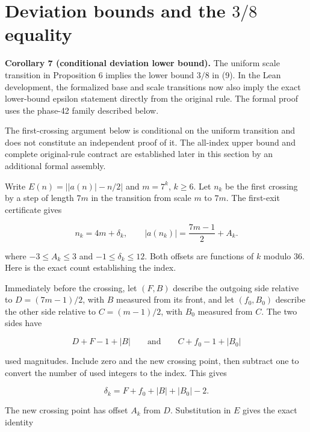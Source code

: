 \documentclass[11pt,a4paper]{article}
\begin{document}
\section{Deviation bounds and the $3/8$ equality}
\label{sec:8}

\noindent\textbf{Corollary 7 (conditional deviation lower bound).} The uniform scale transition in Proposition 6 implies the lower bound $3/8$ in (9). In the Lean development, the formalized base and scale transitions now also imply the exact lower-bound epsilon statement directly from the original rule. The formal proof uses the phase-42 family described below.

The first-crossing argument below is conditional on the uniform transition
and does not constitute an independent proof of it. The all-index upper
bound and complete original-rule contract are established later in this
section by an additional formal assembly.

Write $E(n)=\bigl||a(n)|-n/2\bigr|$ and $m=7^k$, $k\ge6$. Let $n_k$ be the first crossing by a step of length $7m$ in the transition from scale $m$ to $7m$. The first-exit certificate gives

\begin{equation*}
n_k=4m+\delta_k,\qquad |a(n_k)|=\frac{7m-1}{2}+A_k. \tag{7}\label{eq:crossing}
\end{equation*}

where $-3\le A_k\le3$ and $-1\le\delta_k\le12$. Both offsets are functions of $k$ modulo 36. Here is the exact count establishing the index.

Immediately before the crossing, let $(F,B)$ describe the outgoing side relative to $D=(7m-1)/2$, with $B$ measured from its front, and let $(f_0,B_0)$ describe the other side relative to $C=(m-1)/2$, with $B_0$ measured from $C$. The two sides have

\begin{equation*}
D+F-1+|B|\qquad\text{and}\qquad C+f_0-1+|B_0|
\end{equation*}

used magnitudes. Include zero and the new crossing point, then subtract one to convert the number of used integers to the index. This gives

\begin{equation*}
\delta_k=F+f_0+|B|+|B_0|-2.
\end{equation*}

The new crossing point has offset $A_k$ from $D$. Substitution in $E$ gives the exact identity
\end{document}
